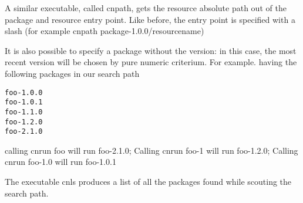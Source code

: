 A similar executable, called cnpath, gets the resource absolute path out of the
package and resource entry point.  Like before, the entry point is specified
with a slash (for example cnpath package-1.0.0/resourcename)

It is also possible to specify a package without the version: in this case, the
most recent version will be chosen by pure numeric criterium.  For example. having the following packages in our search path
\begin{verbatim}
foo-1.0.0
foo-1.0.1
foo-1.1.0
foo-1.2.0
foo-2.1.0
\end{verbatim}

calling cnrun foo will run foo-2.1.0; Calling cnrun foo-1 will run
foo-1.2.0; Calling cnrun foo-1.0 will run foo-1.0.1

The executable cnls produces a list of all the packages found while scouting the search path.

